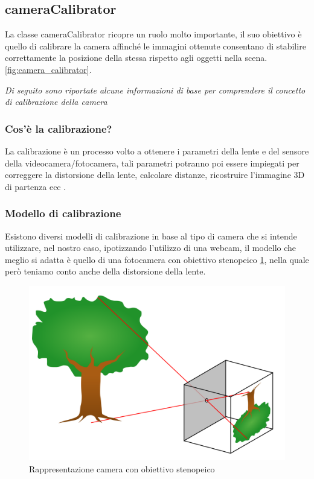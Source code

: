 \documentclass[12pt,a4paper,openright,twoside]{book}
\begin{document}
\subsection{cameraCalibrator}
La classe cameraCalibrator ricopre un ruolo molto importante, il suo obiettivo è quello di calibrare la camera affinché le immagini ottenute consentano di stabilire correttamente la posizione della stessa rispetto agli oggetti nella scena. \ref{fig:camera_calibrator}.

\vspace{0.5cm}
\textit{Di seguito sono riportate alcune informazioni di base per comprendere il concetto di calibrazione della camera}	
\subsubsection{Cos'è la calibrazione?}
La calibrazione è un processo volto a ottenere i parametri della lente e del sensore della videocamera/fotocamera,
tali parametri potranno poi essere impiegati per correggere la distorsione della lente, calcolare distanze, ricostruire l'immagine 3D di partenza ecc \cite{cameraCalibrationMathWorks}.
\subsubsection{Modello di calibrazione}
Esistono diversi modelli di calibrazione in base al tipo di camera che si intende utilizzare, nel nostro caso, ipotizzando l'utilizzo di una webcam, il modello che meglio si adatta è quello di una fotocamera con obiettivo stenopeico \ref{fig:pinhole_camera}, nella quale però teniamo conto anche della distorsione della lente. \cite{pinholeCamera} \cite{pinholeCameraModel} 
\begin{figure}
	\centering
	\includegraphics[width=0.5\linewidth]{./figures/Pinhole-camera.png}
	\caption{Rappresentazione camera con obiettivo stenopeico}
	\label{fig:pinhole_camera}
\end{figure}
\end{document}

